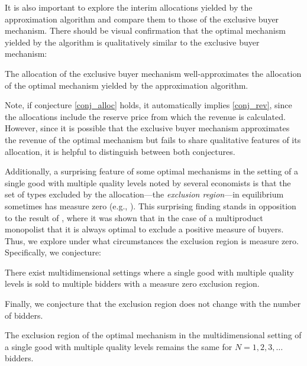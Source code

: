 It is also important to explore the interim allocations yielded by the approximation algorithm and compare them to those of the exclusive buyer mechanism. There should be visual confirmation that the optimal mechanism yielded by the algorithm is qualitatively similar to the exclusive buyer mechanism:

\begin{conjecture}[Allocations]\label{conj_alloc}
The allocation of the exclusive buyer mechanism well-approximates the allocation of the optimal mechanism yielded by the approximation algorithm.
\end{conjecture}

\noindent Note, if conjecture \ref{conj_alloc} holds, it automatically implies \ref{conj_rev}, since the allocations include the reserve price from which the revenue is calculated. However, since it is possible that the exclusive buyer mechanism approximates the revenue of the optimal mechanism but fails to share qualitative features of its allocation, it is helpful to distinguish between both conjectures.

Additionally, a surprising feature of some optimal mechanisms in the setting of a single good with multiple quality levels noted by several economists is that the set of types excluded by the allocation---the \textit{exclusion region}---in equilibrium sometimes has measure zero (e.g., \cite{thirumulanathan2019, belloni2010multidimensional}). This surprising finding stands in opposition to the result of \autocite{armstrong1996multiproduct}, where it was shown that in the case of a multiproduct monopolist that it is always optimal to exclude a positive measure of buyers. Thus, we explore under what circumstances the exclusion region is measure zero. Specifically, we conjecture:

\begin{conjecture}\label{conj_excl_zero}
There exist multidimensional settings where a single good with multiple quality levels is sold to multiple bidders with a measure zero exclusion region.
\end{conjecture}

Finally, we conjecture that the exclusion region does not change with the number of bidders.

\begin{conjecture}\label{conj_excl_n}
The exclusion region of the optimal mechanism in the multidimensional setting of a single good with multiple quality levels remains the same for $N=1,2,3,\dots$ bidders. 
\end{conjecture}










